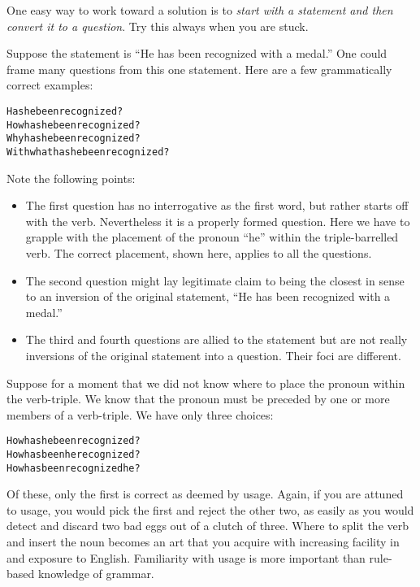 \documentclass[
  12pt,
  a4paper,
]{article}
\newcommand\pronoun[1]{\textcolor{pronoun}{#1}}
\newcommand\action[1]{\textcolor{action}{#1}}
\begin{document}
One easy way to work toward a solution is to \emph{start with a
statement and then convert it to a question}. Try this always when you
are stuck.

Suppose the statement is ``He has been recognized with a medal.'' One
could frame many questions from this one statement. Here are a few
grammatically correct examples:

\begin{tcolorbox}
\begin{alltt}
\color{normal}
\action{Has} \pronoun{he} \action{been recognized}?
How \action{has} \pronoun{he} \action{been recognized}?
Why \action{has} \pronoun{he} \action{been recognized}?
With what \action{has} \pronoun{he} \action{been recognized}?
\end{alltt}
\end{tcolorbox}

Note the following points:

\begin{itemize}
\item
  The first question has no interrogative as the first word, but rather
  starts off with the verb. Nevertheless it is a properly formed
  question. Here we have to grapple with the placement of the pronoun
  ``he'' within the triple-barrelled verb. The correct placement, shown
  here, applies to all the questions.
\item
  The second question might lay legitimate claim to being the closest in
  sense to an inversion of the original statement, ``He has been
  recognized with a medal.''
\item
  The third and fourth questions are allied to the statement but are not
  really inversions of the original statement into a question. Their
  foci are different.
\end{itemize}

Suppose for a moment that we did not know where to place the pronoun
within the verb-triple. We know that the pronoun must be preceded by one
or more members of a verb-triple. We have only three choices:

\begin{tcolorbox}
\begin{alltt}
\color{normal}
How \action{has} \pronoun{he} \action{been recognized}?
How \action{has been} \pronoun{he} \action{recognized}?
How \action{has been recognized} \pronoun{he}?
\end{alltt}
\end{tcolorbox}

Of these, only the first is correct as deemed by usage. Again, if you
are attuned to usage, you would pick the first and reject the other two,
as easily as you would detect and discard two bad eggs out of a clutch
of three. Where to split the verb and insert the noun becomes an art
that you acquire with increasing facility in and exposure to English.
Familiarity with usage is more important than rule-based knowledge of
grammar.
\end{document}
